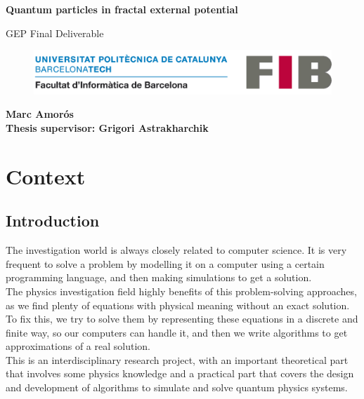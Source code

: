 \documentclass{article}
\begin{document}
\begin{titlepage}
    \begin{center}
        \vspace*{1cm}
        \Huge
        \textbf{Quantum particles in fractal external potential}

        \vspace{0.5cm}
        \Large
        GEP Final Deliverable
        \vfill
        \begin{figure}[h!]
            \includegraphics[width=\textwidth]{./logo-fib.png}
        \end{figure}
        \textbf{Marc Amorós}\\
        \vspace{0.5cm}
        \textbf{Thesis supervisor: Grigori Astrakharchik}\\
        \vspace{0.5cm}

   \end{center}
\end{titlepage}

\tableofcontents
\break

\section{Context}
\subsection{Introduction}
The investigation world is always closely related to computer science. It is very frequent to solve a problem by modelling it on a computer using a certain programming language, and then making simulations to get a solution.\\

The physics investigation field highly benefits of this problem-solving approaches, as we find plenty of equations with physical meaning without an exact solution. To fix this, we try to solve them by representing these equations in a discrete and finite way, so our computers can handle it, and then we write algorithms to get approximations of a real solution.\\

This is an interdisciplinary research project, with an important theoretical part that involves some physics knowledge and a practical part that covers the design and development of algorithms to simulate and solve quantum physics systems.\\
\end{document}
